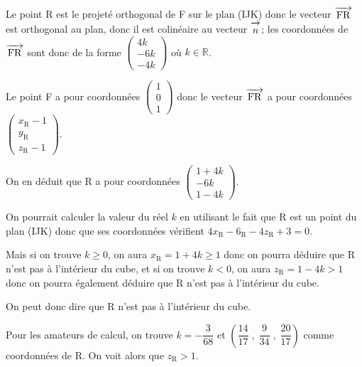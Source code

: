 \documentclass[10pt]{article}
\newcommand{\R}{\mathbb{R}}
\newcommand{\vect}[1]{\overrightarrow{\,\mathstrut#1\,}}
\begin{document}


Le point R est le projeté orthogonal de F sur le plan (IJK) donc le vecteur $\vect{\mathrm{FR}}$ est orthogonal au plan, donc il est colinéaire au vecteur $\vect n$;  les coordonnées de $\vect{\mathrm{FR}}$ sont donc de la forme 
$\begin{pmatrix} 4k \\ -6k \\ -4k \end{pmatrix}$ où $k\in\R$.

Le point F a pour coordonnées
$\begin{pmatrix}  1 \\ 0 \\ 1 \end{pmatrix}$
donc le vecteur $\vect{\mathrm{FR}}$ a pour coordonnées 
$\begin{pmatrix}  x_{\mathrm{R}} - 1 \\ y_{\mathrm{R}} \\ z_{\mathrm{R}}-1 \end{pmatrix}$.

On en déduit que R a pour coordonnées
$\begin{pmatrix} 1+4k \\ -6k \\ 1-4k \end{pmatrix}$.

On pourrait calculer la valeur du réel $k$ en utilisant le fait que R est un point du plan (IJK) donc que ses coordonnées vérifient $4x_{\mathrm{R}} - 6_{\mathrm{R}} -4z_{\mathrm{R}} +3=0$.

Mais si on trouve $k\geqslant 0$, on aura $x_{\mathrm{R}} = 1+4k \geqslant 1$ donc on pourra déduire que R n'est pas à l'intérieur du cube, et si on trouve $k<0$, on aura $z_{\mathrm{R}}=1-4k >1$ donc on pourra également déduire que R n'est pas à l'intérieur du cube.

On peut donc dire que R n'est pas à l'intérieur du cube.

\medskip

Pour les amateurs de calcul, on trouve $k=-\dfrac{3}{68}$ et
$\left ( \dfrac{14}{17}\;,\; \dfrac{9}{34}\;,\;\dfrac{20}{17}\right )$ comme coordonnées de R. On voit alors que $z_{\mathrm{R}}>1$.


\vspace{0.5cm}
\end{document}
